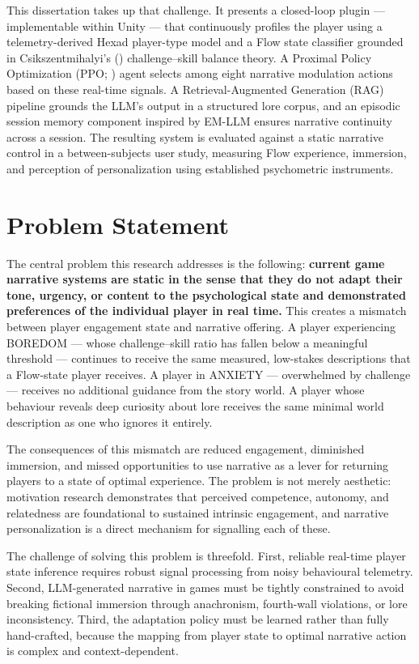 \documentclass[12pt,a4paper]{report}
\begin{document}
This dissertation takes up that challenge. It presents a closed-loop plugin --- implementable within Unity --- that continuously profiles the player using a telemetry-derived Hexad player-type model \citep{tondello2016hexad} and a Flow state classifier grounded in Csikszentmihalyi's (\citeyear{csikszentmihalyi1990flow}) challenge--skill balance theory. A Proximal Policy Optimization (PPO; \citealp{schulman2017proximal}) agent selects among eight narrative modulation actions based on these real-time signals. A Retrieval-Augmented Generation (RAG) pipeline grounds the LLM's output in a structured lore corpus, and an episodic session memory component inspired by EM-LLM \citep{fountas2024episodic} ensures narrative continuity across a session. The resulting system is evaluated against a static narrative control in a between-subjects user study, measuring Flow experience, immersion, and perception of personalization using established psychometric instruments.

\section{Problem Statement}

The central problem this research addresses is the following: \textbf{current game narrative systems are static in the sense that they do not adapt their tone, urgency, or content to the psychological state and demonstrated preferences of the individual player in real time.} This creates a mismatch between player engagement state and narrative offering. A player experiencing BOREDOM --- whose challenge--skill ratio has fallen below a meaningful threshold --- continues to receive the same measured, low-stakes descriptions that a Flow-state player receives. A player in ANXIETY --- overwhelmed by challenge --- receives no additional guidance from the story world. A player whose behaviour reveals deep curiosity about lore receives the same minimal world description as one who ignores it entirely.

The consequences of this mismatch are reduced engagement, diminished immersion, and missed opportunities to use narrative as a lever for returning players to a state of optimal experience. The problem is not merely aesthetic: motivation research \citep{ryan2000self} demonstrates that perceived competence, autonomy, and relatedness are foundational to sustained intrinsic engagement, and narrative personalization is a direct mechanism for signalling each of these.

The challenge of solving this problem is threefold. First, reliable real-time player state inference requires robust signal processing from noisy behavioural telemetry. Second, LLM-generated narrative in games must be tightly constrained to avoid breaking fictional immersion through anachronism, fourth-wall violations, or lore inconsistency. Third, the adaptation policy must be learned rather than fully hand-crafted, because the mapping from player state to optimal narrative action is complex and context-dependent.
\end{document}
